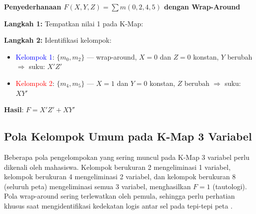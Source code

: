 \begin{contoh}
\textbf{Penyederhanaan $F(X,Y,Z) = \sum m(0, 2, 4, 5)$ dengan Wrap-Around}

\textbf{Langkah 1:} Tempatkan nilai 1 pada K-Map:

\begin{center}
\end{center}

\textbf{Langkah 2:} Identifikasi kelompok:
\begin{itemize}
    \item \textcolor{blue}{Kelompok 1}: $\{m_0, m_2\}$ --- wrap-around, $X = 0$ dan $Z = 0$ konstan, $Y$ berubah $\Rightarrow$ suku: $X'Z'$
    \item \textcolor{red}{Kelompok 2}: $\{m_4, m_5\}$ --- $X = 1$ dan $Y = 0$ konstan, $Z$ berubah $\Rightarrow$ suku: $XY'$
\end{itemize}

\textbf{Hasil}: $F = X'Z' + XY'$
\end{contoh}

\subsection{Pola Kelompok Umum pada K-Map 3 Variabel}

Beberapa pola pengelompokan yang sering muncul pada K-Map 3 variabel perlu dikenali oleh mahasiswa. Kelompok berukuran 2 mengeliminasi 1 variabel, kelompok berukuran 4 mengeliminasi 2 variabel, dan kelompok berukuran 8 (seluruh peta) mengeliminasi semua 3 variabel, menghasilkan $F = 1$ (tautologi). Pola wrap-around sering terlewatkan oleh pemula, sehingga perlu perhatian khusus saat mengidentifikasi kedekatan logis antar sel pada tepi-tepi peta \cite{wiki_karnaugh}.
